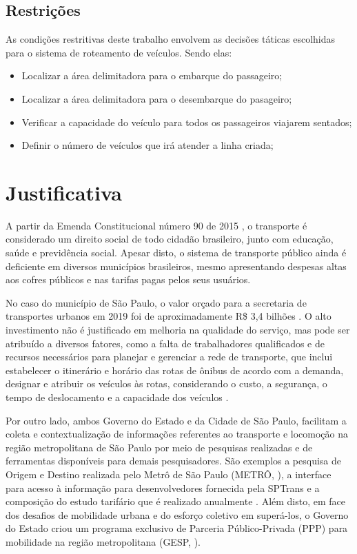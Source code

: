 \subsection{Restrições}
As condições restritivas deste trabalho envolvem as decisões táticas escolhidas para o sistema de roteamento de veículos. Sendo elas:
\begin{itemize}
    \item Localizar a área delimitadora para o embarque do passageiro;
    
    \item Localizar a área delimitadora para o desembarque do pasageiro;
    
    \item Verificar a capacidade do veículo para todos os passageiros viajarem sentados;
    
    \item Definir o número de veículos que irá atender a linha criada;
    
\end{itemize}

\section{Justificativa}
A partir da Emenda Constitucional número 90 de 2015 \cite{pec}, o transporte é considerado um direito social de todo cidadão brasileiro, junto com educação, saúde e previdência social. Apesar disto, o sistema de transporte público ainda é deficiente em diversos municípios brasileiros, mesmo apresentando despesas altas aos cofres públicos e nas tarifas pagas pelos seus usuários. 
 
No caso do município de São Paulo, o valor orçado para a secretaria de transportes urbanos em 2019 foi de aproximadamente R\$ 3,4 bilhões \cite{loatrans}. O alto investimento não é justificado em melhoria na qualidade do serviço, mas pode ser atribuído a diversos fatores, como a falta de trabalhadores qualificados e de recursos necessários para planejar e gerenciar a rede de transporte, que inclui estabelecer o itinerário e horário das rotas de ônibus de acordo com a demanda, designar e atribuir os veículos às rotas, considerando o custo, a segurança, o tempo de deslocamento e a capacidade dos veículos \cite{lima2016mixed}.

Por outro lado, ambos Governo do Estado e da Cidade de São Paulo, facilitam a coleta e contextualização de informações referentes ao transporte e locomoção na região metropolitana de São Paulo por meio de pesquisas realizadas e de ferramentas disponíveis para demais pesquisadores. São exemplos a pesquisa de Origem e Destino realizada pelo Metrô de São Paulo (METRÔ, \citeyear{odpq}), a interface para acesso à informação para desenvolvedores fornecida pela SPTrans \cite{sptranspq} e a composição do estudo tarifário que é realizado anualmente \cite{tarifapq}. Além disto, em face dos desafios de mobilidade urbana e do esforço coletivo em superá-los, o Governo do Estado criou um programa exclusivo de Parceria Público-Privada (PPP) para mobilidade na região metropolitana (GESP, \citeyear{ppppq}).

